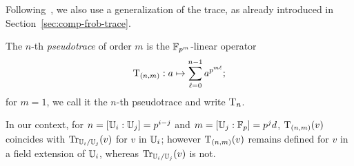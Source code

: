Following~\cite{vzgathen+shoup92,couveignes00}, we also use a
generalization of the trace, as already introduced in
Section~\ref{sec:comp-frob-trace}.

\begin{definition}[Pseudotrace]
  The $n$-th {\em pseudotrace} of order $m$ is the
  $\mathbb{F}_{p^m}$-linear operator
  \begin{equation*}
    \operatorname{T}_{(n,m)}: a \mapsto \sum_{\ell=0}^{n-1}a^{p^{m\ell}}
    \text{;}
  \end{equation*}
  for $m=1$, we call it the $n$-th pseudotrace and write $\operatorname{T}_n$.
\end{definition}

\begin{nota}
    In our context, for $n=[\mathbb{U}_i:\mathbb{U}_j]=p^{i-j}$ and
  $m=[\mathbb{U}_j:\mathbb{F}_p]=p^jd$, $\operatorname{T}_{(n,m)}(v)$ coincides with
  $\operatorname{Tr}_{\mathbb{U}_{i}/\mathbb{U}_j}(v)$ for $v$ in $\mathbb{U}_i$; however $\operatorname{T}_{(n,m)}(v)$
  remains defined for $v$ in a field extension of $\mathbb{U}_i$, whereas
  $\operatorname{Tr}_{\mathbb{U}_{i}/\mathbb{U}_j}(v)$ is not.
\end{nota}


%
